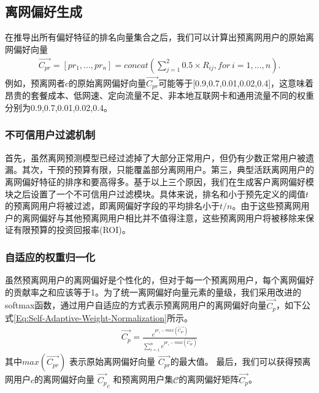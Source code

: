 \subsection{离网偏好生成}
在推导出所有偏好特征的排名向量集合之后，我们可以计算出预离网用户的原始离网偏好向量
\begin{equation}
	\begin{aligned}
		\overrightarrow{C_{pr}} =[pr_{1}, ..., pr_{n}] = concat(\sum_{j=1}^{2} 0.5 \times R_{ij}, for ~ i=1, ..., n).
	\end{aligned}
	\label{Eq:Jaccard-Similarit-Coefficient}
\end{equation}	
例如，预离网者$c$的原始离网偏好向量$\overrightarrow{C_{pr}}$可能等于[0.9,0.7,0.01,0.02,0.4]，这意味着昂贵的套餐成本、低网速、定向流量不足、非本地互联网卡和通用流量不同的权重分别为0.9,0.7,0.01,0.02,0.4。

\subsubsection{不可信用户过滤机制}
首先，虽然离网预测模型已经过滤掉了大部分正常用户，但仍有少数正常用户被遗漏。其次，干预的预算有限，只能覆盖部分离网用户。第三，典型活跃离网用户的离网偏好特征的排序和要高得多。基于以上三个原因，我们在生成客户离网偏好模块之后设置了一个不可信用户过滤模块。具体来说，排名和小于预先定义的阈值$t$的预离网用户将被过滤，即离网偏好字段的平均排名小于$t/n$。由于这些预离网用户的离网偏好与其他预离网用户相比并不值得注意，这些预离网用户将被移除来保证有限预算的投资回报率(ROI)。

\subsubsection{自适应的权重归一化}
虽然预离网用户的离网偏好是个性化的，但对于每一个预离网用户，每个离网偏好的贡献率之和应该等于1。为了统一离网偏好向量元素的量级，我们采用改进的softmax函数，通过用户自适应的方式表示预离网用户的离网偏好向量$\overrightarrow{C_{p}}$，如下公式\ref{Eq:Self-Adaptive-Weight-Normalization}所示。
\begin{equation}
	\begin{aligned}
		\overrightarrow{C_{p}}  = \frac{e^{pr_{i}-max(\overrightarrow{C_{pr}})}}{\sum_{i=1}^{n} e^{pr_{i}-max(\overrightarrow{C_{pr}})}}
	\end{aligned}
	\label{Eq:Self-Adaptive-Weight-Normalization}
\end{equation}	
其中$max(\overrightarrow{C_{pr}})$ 表示原始离网偏好向量 $\overrightarrow{C_{pr}}$的最大值。 最后，我们可以获得预离网用户$c$的离网偏好向量 $\overrightarrow{C_{p}}_c$ 和预离网用户集$\mathcal{C}$的离网偏好矩阵$\overrightarrow{C_{p}}$。
\par

